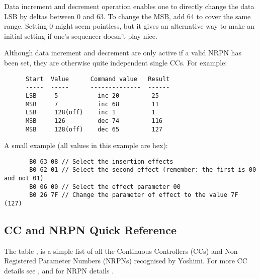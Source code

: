    Data increment and decrement operation enables one to directly change the
   data LSB by deltas between 0 and 63.
   To change the MSB, add 64 to cover the same
   range. Setting 0 might seem pointless, but it gives an alternative way
   to make an initial setting if one's sequencer doesn't play nice.

   Although data increment and decrement are only active if a valid NRPN has
   been set, they are otherwise quite independent single CCs.  For example:

   \begin{verbatim}
      Start  Value      Command value   Result
      -----  -----      --------------  ------
      LSB     5           inc 20         25
      MSB     7           inc 68         11
      LSB     128(off)    inc 1          1
      MSB     126         dec 74         116
      MSB     128(off)    dec 65         127
   \end{verbatim}

   A small example (all values in this example are hex):

   \begin{verbatim}
       B0 63 08 // Select the insertion effects
       B0 62 01 // Select the second effect (remember: the first is 00 and not 01)
       B0 06 00 // Select the effect parameter 00
       B0 26 7F // Change the parameter of effect to the value 7F (127)
   \end{verbatim}

\subsection{CC and NRPN Quick Reference}
\label{subsection:cc_nrpn_quick_ref}
   The table , is a simple list of all the
   Continuous Controllers (CCs) and Non Registered Parameter Numbers (NRPNs)
   recognised by Yoshimi.
   For more CC details see , and for NRPN details .

